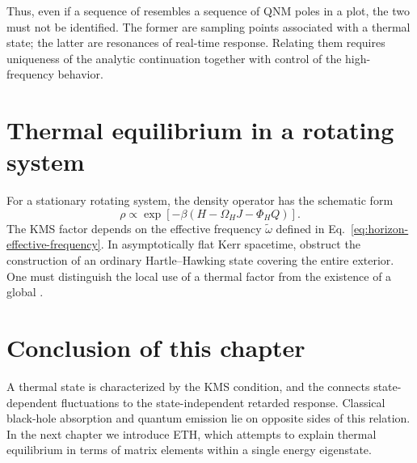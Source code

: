 Thus, even if a sequence of  resembles a sequence of QNM poles in a plot, the two must not be identified. The former are sampling points associated with a thermal state; the latter are resonances of real-time response. Relating them requires uniqueness of the analytic continuation together with control of the high-frequency behavior.

\section{Thermal equilibrium in a rotating system}

For a stationary rotating system, the density operator has the schematic form
\begin{equation}
\rho
\mathrel{\propto}
\exp\left[
-\beta
\left(
H-\Omega_H J-\Phi_H Q
\right)
\right].
\label{eq:rotating-gibbs}
\end{equation}
The KMS factor depends on the effective frequency $\widetilde\omega$ defined in Eq.~\eqref{eq:horizon-effective-frequency}. In asymptotically flat Kerr spacetime,  obstruct the construction of an ordinary Hartle--Hawking state covering the entire exterior. One must distinguish the local use of a thermal factor from the existence of a global .

\section{Conclusion of this chapter}

A thermal state is characterized by the KMS condition, and the  connects state-dependent fluctuations to the state-independent retarded response. Classical black-hole absorption and quantum emission lie on opposite sides of this relation. In the next chapter we introduce ETH, which attempts to explain thermal equilibrium in terms of matrix elements within a single energy eigenstate.
